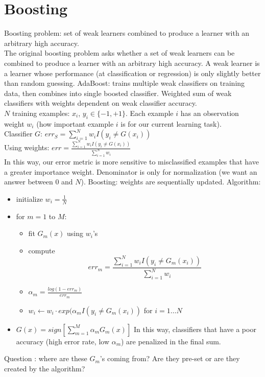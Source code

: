 \documentclass[11pt]{article}
\begin{document}
\section{Boosting}
Boosting problem: set of weak learners combined to produce a learner with an arbitrary high accuracy.\\
The original boosting problem asks whether a set
of weak learners can be combined to produce a learner with an arbitrary
high accuracy. A weak learner is a learner whose performance (at
classification or regression) is only slightly better than random guessing.
AdaBoost: trains multiple weak classifiers on training data, then combines into single boosted classifier. Weighted sum of weak classifiers with weights dependent on weak classifier accuracy.\\
$N$ training examples: $x_i$, $y_i \in \{-1, +1\}$. Each example $i$ has an observation weight $w_i$ (how important example $i$ is for our current learning task).\\
Classifier $G$: $err_S = \sum_{i=1}^N{w_i I(y_i \neq G(x_i))}$ \\
Using weights: $err = \frac{\sum_{i=1}^N{w_i I(y_i \neq G(x_i))}}{\sum_{i=1}^N w_i}$\\
In this way, our error metric is more sensitive to misclassified examples
that have a greater importance weight. Denominator is only for normalization (we want an answer between 0 and $N$).
Boosting: weights are sequentially updated. Algorithm:\\
\begin{itemize}
\item initialize $w_i = \frac1N$
\item for $m =1$ to $M$:
\begin{itemize}
\item fit $G_m(x)$ using $w_i$'s
\item compute $$err_m = \frac{\sum_{i=1}^N{w_i I(y_i \neq G_m(x_i))}}{\sum_{i=1}^N w_i}$$
\item $\alpha_m = \frac{log(1-err_m)}{err_m}$
\item $w_i \leftarrow w_i \cdot exp(\alpha_m I(y_i \neq G_m(x_i))$ for $i = 1 \dots N$
\end{itemize}
\item $G(x) = sign [ \sum_{m=1}^M \alpha_m G_m(x)]$ In this way, classifiers that have a poor accuracy (high error rate, low $\alpha_m$) are penalized in the final sum.
\end{itemize}

Question : where are these $G_m$'s coming from? Are they pre-set or are they created by the algorithm?
\end{document}
